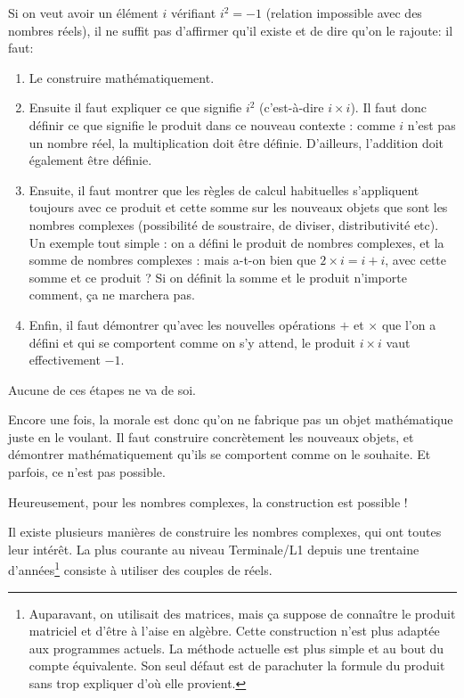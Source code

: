 Si on veut avoir un élément $i$ vérifiant $i^2=-1$ (relation impossible avec des nombres réels), il ne suffit pas d'affirmer qu'il existe et de dire qu'on le rajoute: il faut:
\begin{enumerate}
\item Le construire mathématiquement.
\item Ensuite il faut expliquer ce que signifie $i^2$ (c'est-à-dire $i\times i$). Il faut donc définir ce que signifie le produit dans ce nouveau contexte : comme $i$ n'est pas un nombre réel, la multiplication doit être définie. D'ailleurs, l'addition doit également être définie.
\item Ensuite, il faut montrer que les règles de calcul habituelles s'appliquent toujours avec ce produit et cette  somme sur les nouveaux objets que sont les nombres complexes (possibilité de soustraire, de diviser, distributivité etc). Un exemple tout simple : on a défini le produit de nombres complexes, et la somme de nombres complexes : mais a-t-on bien que $2\times i = i+i$, avec cette somme et ce produit ? Si on définit la somme et le produit n'importe comment, ça ne marchera pas.
\item Enfin, il faut démontrer qu'avec les nouvelles opérations $+$ et $\times$ que l'on a défini et qui se comportent comme on s'y attend, le produit $i\times i$ vaut effectivement $-1$.
\end{enumerate}    

Aucune de ces étapes ne va de soi.


\begin{mdframed}
Encore une fois, la morale est donc qu'on ne fabrique pas un objet mathématique juste en le voulant. Il faut construire concrètement les nouveaux objets, et démontrer mathématiquement qu'ils se comportent comme on le souhaite. Et parfois, ce n'est pas possible.

Heureusement, pour les nombres complexes, la construction est possible !
\end{mdframed}


Il existe plusieurs manières de construire les nombres complexes, qui ont toutes leur intérêt. La plus courante au niveau Terminale/L1 depuis une trentaine d'années\footnote{Auparavant, on utilisait des matrices, mais ça suppose de connaître le produit matriciel et d'être à l'aise en algèbre. Cette construction n'est plus adaptée aux programmes actuels. La méthode actuelle est plus simple et au bout du compte équivalente. Son seul défaut est de \og parachuter\fg{} la formule du produit sans trop expliquer d'où elle provient.} consiste à utiliser des couples de réels.

